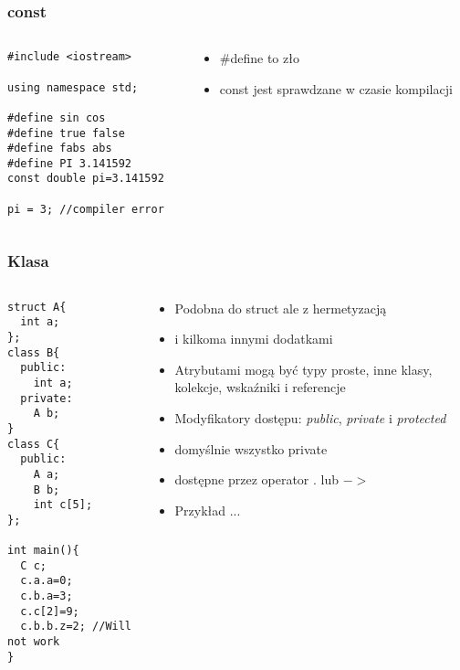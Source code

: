 \documentclass[10pt]{beamer}
\begin{document}
\begin{frame}[fragile]
  \frametitle{const}
  \begin{columns}
    \begin{column}{0.48\textwidth}
      \begin{lstlisting}
#include <iostream>

using namespace std;

#define sin cos
#define true false
#define fabs abs
#define PI 3.141592
const double pi=3.141592

pi = 3; //compiler error
\end{lstlisting}
    \end{column}
    \begin{column}{0.48\textwidth}
      \begin{itemize}
        \item \#define to zło
        \item const jest sprawdzane w czasie kompilacji
      \end{itemize}
    \end{column}
  \end{columns}
\end{frame}

\begin{frame}[fragile]
  \frametitle{Klasa}
  \begin{columns}
    \begin{column}{0.48\textwidth}
\begin{lstlisting}
struct A{
  int a;
};
class B{
  public:
    int a;
  private:
    A b;
}
class C{
  public:
    A a;
    B b;
    int c[5];
};

int main(){
  C c;
  c.a.a=0;
  c.b.a=3;
  c.c[2]=9;
  c.b.b.z=2; //Will not work
}
\end{lstlisting}
    \end{column}
    \begin{column}{0.48\textwidth}
      \begin{itemize}
        \item Podobna do struct ale z hermetyzacją
        \item i kilkoma innymi dodatkami
        \item Atrybutami mogą być typy proste, inne klasy, kolekcje, wskaźniki i referencje
        \item Modyfikatory dostępu: \textit{public}, \textit{private} i \textit{protected}
        \item domyślnie wszystko private
        \item dostępne przez operator . lub $->$
        \item Przykład ...
      \end{itemize}
    \end{column}
  \end{columns}
\end{frame}
\end{document}
